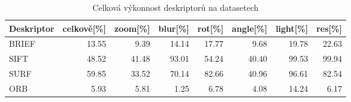 \begin{table}[htbp]\centering
\begin{tabular}{ l| r r r r r r r }
	Deskriptor & celkově[\%] & zoom[\%] & blur[\%] & rot[\%] & angle[\%] & light[\%] & res[\%] \\
	\hline
	 BRIEF & 13.55 & 9.39 & 14.14 & 17.77 & 9.68 & 19.78 & 22.63 \\
	 SIFT & 48.52 & 41.48 & 93.01 & 54.24 & 40.40 & 99.53 & 99.94 \\
	 SURF & 59.85 & 33.52 & 70.14 & 82.66 & 40.96 & 96.61 & 82.54 \\
	 ORB & 5.93 & 5.81 & 1.25 & 6.78 & 4.08 & 14.24 & 6.17
\end{tabular}
	\caption[Short Heading]{\protect Celková výkonnost deskriptorů na datasetech}\label{tab_descperf}
\end{table}